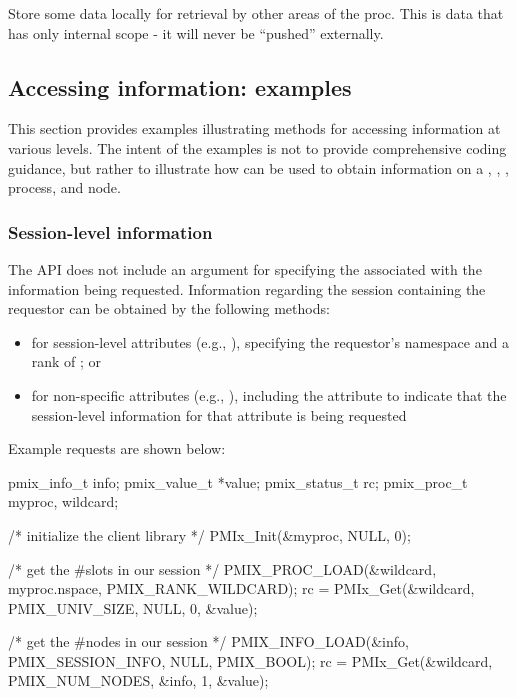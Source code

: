 Store some data locally for retrieval by other areas of the proc.
This is data that has only internal scope - it will never be ``pushed'' externally.

\subsection{Accessing information: examples}
\label{chap:api_kv:getex}

This section provides examples illustrating methods for accessing information at various levels. The intent of the examples is not to provide comprehensive coding guidance, but rather to illustrate how  can be used to obtain information on a , , , process, and node.

\subsubsection{Session-level information}

The  \ac{API} does not include an argument for specifying the  associated with the information being requested. Information regarding the session containing the requestor can be obtained by the following methods:

\begin{itemize}
\item for session-level attributes (e.g., ), specifying the requestor's namespace and a rank of ; or
\item for non-specific attributes (e.g., ), including the  attribute to indicate that the session-level information for that attribute is being requested
\end{itemize}

Example requests are shown below:

\cspecificstart
\begin{codepar}
pmix_info_t info;
pmix_value_t *value;
pmix_status_t rc;
pmix_proc_t myproc, wildcard;

/* initialize the client library */
PMIx_Init(&myproc, NULL, 0);

/* get the #slots in our session */
PMIX_PROC_LOAD(&wildcard, myproc.nspace, PMIX_RANK_WILDCARD);
rc = PMIx_Get(&wildcard, PMIX_UNIV_SIZE, NULL, 0, &value);

/* get the #nodes in our session */
PMIX_INFO_LOAD(&info, PMIX_SESSION_INFO, NULL, PMIX_BOOL);
rc = PMIx_Get(&wildcard, PMIX_NUM_NODES, &info, 1, &value);
\end{codepar}
\cspecificend

